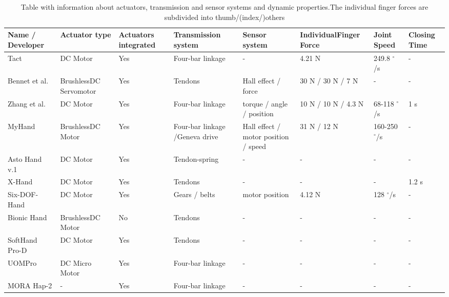 \documentclass[a4paper, 10pt, conference]{ieeeconf}      %
\begin{document}
\vspace{10cm}

\begin{table*}[h]

\begin{tabular}{p{2.4cm}|p{2cm}|p{1.2cm}|p{2.1cm}|p{2cm}|p{1.5cm}|p{1.5cm}|p{1.2cm}}

Name / \newline Developer & Actuator type & Actuators integrated & Transmission system & Sensor system & Individual\newline Finger Force & Joint Speed & Closing Time\\
\hline
Tact & DC Motor & Yes & Four-bar linkage & - & 4.21 N & 249.8 $^\circ$/s & -\\
\hline
Bennet et al. & Brushless\newline DC Servomotor & Yes & Tendons & Hall effect / force & 30 N / 30 N / 7 N & - & -\\
\hline
Zhang et al. & DC Motor & Yes & Four-bar linkage & torque / angle / position & 10 N / 10 N / 4.3 N & 68-118 $^\circ$/s & 1 s\\
\hline
MyHand & Brushless\newline DC Motor & Yes & Four-bar linkage /\newline Geneva drive & Hall effect / motor position / speed & 31 N / 12 N & 160-250 $^\circ$/s & -\\
\hline
Asto Hand v.1 & DC Motor & Yes & Tendon-spring & - & - & - & -\\
\hline
X-Hand & DC Motor & Yes & Tendons & - & - & - & 1.2 s\\
\hline
Six-DOF-Hand & DC Motor & Yes & Gears / belts & motor position & 4.12 N & 128 $^\circ$/s & -\\
\hline
Bionic Hand & Brushless\newline DC Motor & No & Tendons & - & - & - & -\\
\hline
SoftHand Pro-D & DC Motor & Yes & Tendons & - & - & - & -\\
\hline
UOMPro & DC Micro Motor & Yes & Four-bar linkage & - & - & - & -\\
\hline
MORA Hap-2 & - & Yes & Four-bar linkage & - & - & - & -\\
 

\end{tabular}

\caption{Table with information about actuators, transmission and sensor systems and dynamic properties.\newline The individual finger forces are subdivided into thumb/(index/)others}

\end{table*}
\end{document}
